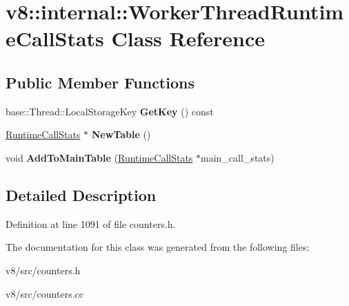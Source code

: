 \hypertarget{classv8_1_1internal_1_1WorkerThreadRuntimeCallStats}{}\section{v8\+:\+:internal\+:\+:Worker\+Thread\+Runtime\+Call\+Stats Class Reference}
\label{classv8_1_1internal_1_1WorkerThreadRuntimeCallStats}
\subsection*{Public Member Functions}
\begin{DoxyCompactItemize}
\item 
\mbox{\label{classv8_1_1internal_1_1WorkerThreadRuntimeCallStats_af2711362e67d977339134dbc3dfc13f7}} 
base\+::\+Thread\+::\+Local\+Storage\+Key {\bfseries Get\+Key} () const
\item 
\mbox{\label{classv8_1_1internal_1_1WorkerThreadRuntimeCallStats_a3ad99a3dbb5d5f1265f00d31baca47f6}} 
\mbox{\hyperlink{classv8_1_1internal_1_1RuntimeCallStats}{Runtime\+Call\+Stats}} $\ast$ {\bfseries New\+Table} ()
\item 
\mbox{\label{classv8_1_1internal_1_1WorkerThreadRuntimeCallStats_aaa4c961e42fb827db570d3ef53f1e119}} 
void {\bfseries Add\+To\+Main\+Table} (\mbox{\hyperlink{classv8_1_1internal_1_1RuntimeCallStats}{Runtime\+Call\+Stats}} $\ast$main\+\_\+call\+\_\+stats)
\end{DoxyCompactItemize}


\subsection{Detailed Description}


Definition at line 1091 of file counters.\+h.



The documentation for this class was generated from the following files\+:\begin{DoxyCompactItemize}
\item 
v8/src/counters.\+h\item 
v8/src/counters.\+cc\end{DoxyCompactItemize}
